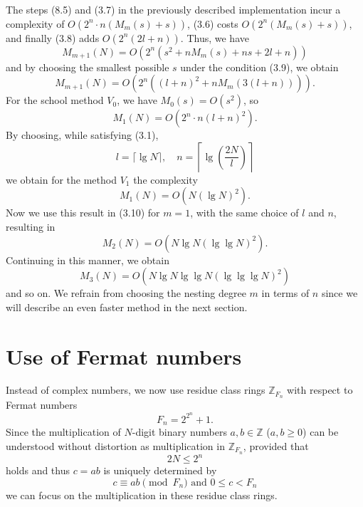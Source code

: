 \documentclass{article}
\begin{document}
The steps (8.5) and (3.7) in the previously described implementation incur a complexity of $O(2^n \cdot n(M_m(s) + s))$, (3.6) costs $O(2^n (M_m(s) + s))$, and finally (3.8) adds $O(2^n (2l + n))$. Thus, we have
\[
M_{m + 1}(N) = O(2^n (s^2 + n M_m(s) + ns + 2l + n))
\]
and by choosing the smallest possible $s$ under the condition (3.9), we obtain
\[
\tag{3.10}
M_{m + 1}(N) = O(2^n((l + n)^2 + nM_m(3(l + n)))).
\]
For the school method $V_0$, we have $M_0(s) = O(s^2)$, so
\[
M_1(N) = O(2^n \cdot n(l + n)^2).
\]
By choosing, while satisfying (3.1),
\[
l = \lceil \lg N \rceil, \quad n = \left\lceil \lg\left(\frac{2N}{l}\right)\right\rceil
\]
we obtain for the method $V_1$ the complexity
\[
\tag{3.11}
M_1(N) = O(N (\lg N)^2).
\]
Now we use this result in (3.10) for $m = 1$, with the same choice of $l$ and $n$, resulting in
\[
M_2(N) = O(N \lg N (\lg \lg N)^2).
\]
Continuing in this manner, we obtain
\[
M_3(N) = O(N \lg N \lg \lg N (\lg \lg \lg N)^2)
\]
and so on. We refrain from choosing the nesting degree $m$ in terms of $n$ since we will describe an even faster method in the next section.

\section{Use of Fermat numbers}
Instead of complex numbers, we now use residue class rings $\mathbb{Z}_{F_n}$ with respect to Fermat numbers
\[
F_n = 2^{2^n} + 1.
\]
Since the multiplication of $N$-digit binary numbers $a, b \in \mathbb{Z}$ ($a, b \ge 0$) can be understood without distortion as multiplication in $\mathbb{Z}_{F_n}$, provided that
\[
\tag{4.1}
2N \le 2^n
\]
holds and thus $c = ab$ is uniquely determined by
\[
\tag{4.2}
c \equiv ab \pmod{F_n}\text{ and }0 \le c < F_n
\]
we can focus on the multiplication in these residue class rings.
\end{document}
